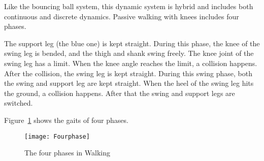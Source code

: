 Like the bouncing ball system, this dynamic system is hybrid\citep{ames2006categorical} and includes both continuous and discrete dynamics.
Passive walking with knees includes four phases\citep{Chen2007}.
\begin{itemize}
The support leg (the blue one) is kept straight.
During this phase, the knee of the swing leg is bended, and the thigh and shank swing freely.
The knee joint of the swing leg has a limit.
When the knee angle reaches the limit, a collision happens.
After the collision, the swing leg is kept straight.
During this swing phase, both the swing and support leg are kept straight.
When the heel of the swing leg hits the ground, a collision happens.
After that the swing and support legs are switched.
\end{itemize}

Figure~\ref{fig:fwalkingphase} shows the gaits of four phases.
\begin{figure}[!htbp]
  \begin{center}
      \texttt{[image: Fourphase]}
    \caption{The four phases in Walking}
    \label{fig:fwalkingphase}
\end{center}
\end{figure}





